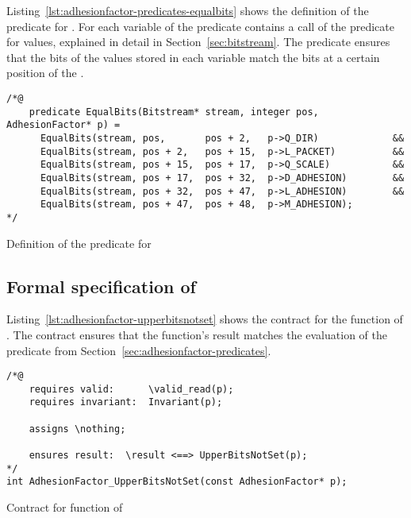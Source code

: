 
Listing~\ref{lst:adhesionfactor-predicates-equalbits} shows the definition of the 
predicate for \adhesion. For each variable of \adhesion the predicate contains a call of the
 predicate for  values, explained in detail in Section~\ref{sec:bitstream}.
The predicate ensures that the bits of the values stored in each variable
match the bits at a certain position of the .

\begin{listing}[hbt]
\begin{minipage}{0.99\textwidth}
\begin{lstlisting}[style=acsl-block]
/*@
    predicate EqualBits(Bitstream* stream, integer pos, AdhesionFactor* p) =
      EqualBits(stream, pos,       pos + 2,   p->Q_DIR)             &&
      EqualBits(stream, pos + 2,   pos + 15,  p->L_PACKET)          &&
      EqualBits(stream, pos + 15,  pos + 17,  p->Q_SCALE)           &&
      EqualBits(stream, pos + 17,  pos + 32,  p->D_ADHESION)        &&
      EqualBits(stream, pos + 32,  pos + 47,  p->L_ADHESION)        &&
      EqualBits(stream, pos + 47,  pos + 48,  p->M_ADHESION);
*/
\end{lstlisting}
\end{minipage}
\caption{\label{lst:adhesionfactor-predicates-equalbits}Definition of the  predicate for \adhesion}
\end{listing}

\FloatBarrier

\subsection{Formal specification of }
\label{sec:adhesionfactor-upperbitsnotset}

Listing~\ref{lst:adhesionfactor-upperbitsnotset} shows the contract for the 
function of \adhesion. The contract ensures that the function's result matches the evaluation
of the  predicate from Section~\ref{sec:adhesionfactor-predicates}.

\begin{listing}[hbt]
\begin{minipage}{0.99\textwidth}
\begin{lstlisting}[style=acsl-block]
/*@
    requires valid:      \valid_read(p);
    requires invariant:  Invariant(p);

    assigns \nothing;

    ensures result:  \result <==> UpperBitsNotSet(p);
*/
int AdhesionFactor_UpperBitsNotSet(const AdhesionFactor* p);
\end{lstlisting}
\end{minipage}
\caption{\label{lst:adhesionfactor-upperbitsnotset}Contract for  function of \adhesion}
\end{listing}

